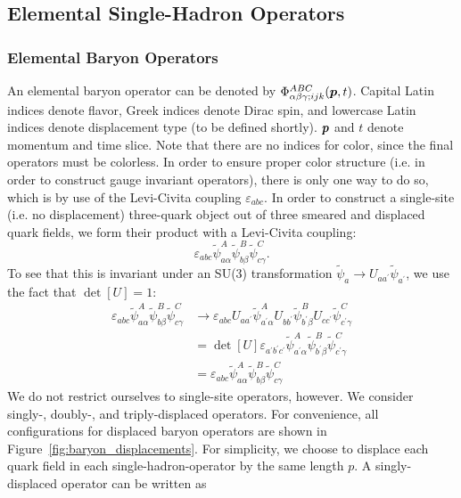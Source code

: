     \subsection{Elemental Single-Hadron Operators}
    \subsubsection{Elemental Baryon Operators}
    An elemental baryon operator can be denoted by $\Phi_{\alpha \beta \gamma; ijk}^{ABC}(\boldsymbol{p}, t)$. Capital Latin indices denote flavor, Greek indices denote Dirac spin, and lowercase Latin indices denote displacement type (to be defined shortly). $\boldsymbol{p}$ and $t$ denote momentum and time slice. Note that there are no indices for color, since the final operators must be colorless. In order to ensure proper color structure (i.e. in order to construct gauge invariant operators), there is only one way to do so, which is by use of the Levi-Civita coupling $\varepsilon_{abc}$. In order to construct a single-site (i.e. no displacement) three-quark object out of three smeared and displaced quark fields, we form their product with a Levi-Civita coupling:
    \begin{equation}
       \varepsilon_{a b c} \widetilde{\psi}_{a \alpha}^{A} \widetilde{\psi}_{b \beta}^{B} \widetilde{\psi}_{c \gamma}^{C}.
    \end{equation}
    To see that this is invariant under an SU(3) transformation $\widetilde\psi_a \rightarrow U_{a a^\prime} \widetilde\psi_{a^\prime}$, we use the fact that $\det[U] = 1$:
    \begin{equation}
        \begin{aligned}
            \varepsilon_{a b c} \widetilde{\psi}_{a \alpha}^{A} \widetilde{\psi}_{b \beta}^{B} \widetilde{\psi}_{c \gamma}^{C} &\rightarrow \varepsilon_{abc} U_{a a^\prime} \widetilde{\psi}_{a^\prime \alpha}^A U_{b b^\prime} \widetilde{\psi}_{b^\prime \beta}^B U_{c c^\prime} \widetilde{\psi}_{c^\prime \gamma}^C \\
            & = \det[U]\varepsilon_{a^\prime b^\prime c^\prime} \widetilde{\psi}_{a^\prime \alpha}^{A} \widetilde{\psi}_{b^\prime \beta}^{B} \widetilde{\psi}_{c^\prime \gamma}^{C} \\
            & = \varepsilon_{a b c} \widetilde{\psi}_{a \alpha}^{A} \widetilde{\psi}_{b \beta}^{B} \widetilde{\psi}_{c \gamma}^{C}
        \end{aligned}
    \end{equation}
    We do not restrict ourselves to single-site operators, however. We consider \mbox{singly-,} \mbox{doubly-,} and triply-displaced operators. For convenience, all configurations for displaced baryon operators are shown in Figure~\ref{fig:baryon_displacements}. For simplicity, we choose to displace each quark field in each single-hadron-operator by the same length $p$. A singly-displaced operator can be written as
